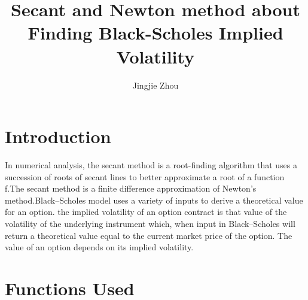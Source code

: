 \documentclass[a4paper]{article}
\title{Secant and Newton method about Finding Black-Scholes Implied Volatility}
\author{Jingjie Zhou}
\begin{document}
\maketitle
\maketitle
\section{Introduction}

In numerical analysis, the secant method is a root-finding algorithm that uses a succession of roots of secant lines to better approximate a root of a function f.The secant method is a finite difference approximation of Newton's method.Black–Scholes model uses a variety of inputs to derive a theoretical value for an option. the implied volatility of an option contract is that value of the volatility of the underlying instrument which, when input in Black–Scholes will return a theoretical value equal to the current market price of the option. The value of an option depends on its implied volatility.

\section{Functions Used}
\end{document}

